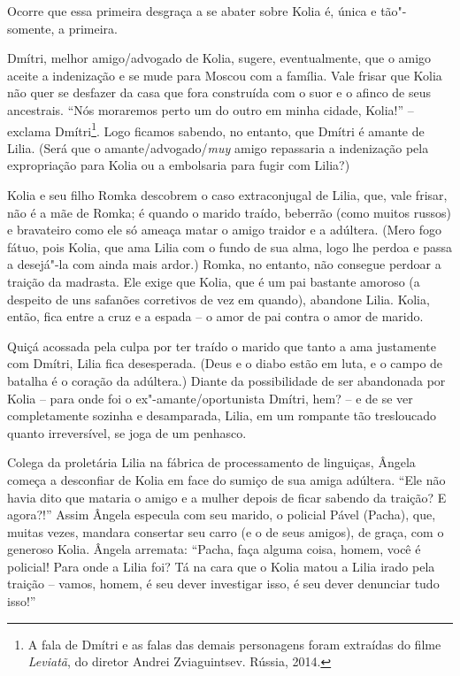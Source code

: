 Ocorre que essa primeira desgraça a se abater sobre Kolia é, única e
tão"-somente, a primeira.

Dmítri, melhor amigo/advogado de Kolia, sugere, eventualmente, que o
amigo aceite a indenização e se mude para Moscou com a família. Vale
frisar que Kolia não quer se desfazer da casa que fora construída com o
suor e o afinco de seus ancestrais. ``Nós moraremos perto um do outro em
minha cidade, Kolia!'' -- exclama Dmítri\footnote{A fala de Dmítri e as
  falas das demais personagens foram extraídas do filme \emph{Leviatã},
  do diretor Andrei Zviaguintsev. Rússia, 2014.}. Logo ficamos sabendo,
no entanto, que Dmítri é amante de Lilia. (Será que o
amante/advogado/\emph{muy} amigo repassaria a indenização pela
expropriação para Kolia ou a embolsaria para fugir com Lilia?)

Kolia e seu filho Romka descobrem o caso extraconjugal de Lilia, que,
vale frisar, não é a mãe de Romka; é quando o marido traído, beberrão
(como muitos russos) e bravateiro como ele só ameaça matar o amigo
traidor e a adúltera. (Mero fogo fátuo, pois Kolia, que ama Lilia com o
fundo de sua alma, logo lhe perdoa e passa a desejá"-la com ainda mais
ardor.) Romka, no entanto, não consegue perdoar a traição da madrasta.
Ele exige que Kolia, que é um pai bastante amoroso (a despeito de uns
safanões corretivos de vez em quando), abandone Lilia. Kolia, então,
fica entre a cruz e a espada -- o amor de pai contra o amor de marido.

Quiçá acossada pela culpa por ter traído o marido que tanto a ama
justamente com Dmítri, Lilia fica desesperada. (Deus e o diabo estão em
luta, e o campo de batalha é o coração da adúltera.) Diante da
possibilidade de ser abandonada por Kolia -- para onde foi o
ex"-amante/oportunista Dmítri, hem? -- e de se ver completamente sozinha
e desamparada, Lilia, em um rompante tão tresloucado quanto
irreversível, se joga de um penhasco.

Colega da proletária Lilia na fábrica de processamento de linguiças,
Ângela começa a desconfiar de Kolia em face do sumiço de sua amiga
adúltera. ``Ele não havia dito que mataria o amigo e a mulher depois de
ficar sabendo da traição? E agora?!'' Assim Ângela especula com seu
marido, o policial Pável (Pacha), que, muitas vezes, mandara consertar
seu carro (e o de seus amigos), de graça, com o generoso Kolia. Ângela
arremata: ``Pacha, faça alguma coisa, homem, você é policial! Para onde
a Lilia foi? Tá na cara que o Kolia matou a Lilia irado pela traição --
vamos, homem, é seu dever investigar isso, é seu dever denunciar tudo
isso!''


